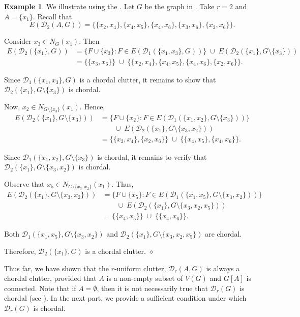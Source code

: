 \documentclass[12pt,reqno]{amsart}
\theoremstyle{definition}
\newtheorem{example}[proposition]{Example}
\def\D{\mathcal{D}}
\begin{document}
\medskip
\begin{example}
We illustrate  using the . Let $G$ be the graph in . Take $r=2$ and $A=\{x_1\}$. Recall that
\[
E(\D_2(A,G))
=
\{\{x_2,x_4\},\{x_4,x_5\},\{x_4,x_6\},\{x_3,x_6\},\{x_2,x_6\}\}.
\]

Consider $x_3 \in N_G(x_1)$. Then
\begin{align*}
E(\D_2(\{x_1\},G))
&=
\{F \cup \{x_3\} : F \in E(\D_1(\{x_1,x_3\},G))\}
\;\cup\;
E(\D_2(\{x_1\},G\setminus\{x_3\})) \\
&=
\{\{x_3,x_6\}\}
\;\cup\;
\{\{x_2,x_4\},\{x_4,x_5\},\{x_4,x_6\},\{x_2,x_6\}\}.
\end{align*}

\noindent
Since $\D_1(\{x_1,x_3\},G)$ is a chordal clutter, it remains to show that
$\D_2(\{x_1\},G\setminus\{x_3\})$ is chordal.

Now, $x_2 \in N_{G\setminus\{x_3\}}(x_1)$. Hence,
\begin{align*}
E(\D_2(\{x_1\},G\setminus\{x_3\}))
&=
\{F \cup \{x_2\} : F \in E(\D_1(\{x_1,x_2\},G\setminus\{x_3\}))\} \\
&\qquad \cup\;
E(\D_2(\{x_1\},G\setminus\{x_3,x_2\})) \\
&=
\{\{x_2,x_4\},\{x_2,x_6\}\}
\;\cup\;
\{\{x_4,x_5\},\{x_4,x_6\}\}.
\end{align*}

\noindent
Since $\D_1(\{x_1,x_2\},G\setminus\{x_3\})$ is chordal, it remains to verify that
$\D_2(\{x_1\},G\setminus\{x_3,x_2\})$ is chordal.

Observe that $x_5 \in N_{G\setminus\{x_3,x_2\}}(x_1)$. Thus,
\begin{align*}
E(\D_2(\{x_1\},G\setminus\{x_3,x_2\}))
&=
\{F \cup \{x_5\} : F \in E(\D_1(\{x_1,x_5\},G\setminus\{x_3,x_2\}))\} \\
&\qquad \cup\;
E(\D_2(\{x_1\},G\setminus\{x_3,x_2,x_5\})) \\
&=
\{\{x_4,x_5\}\}
\;\cup\;
\{\{x_4,x_6\}\}.
\end{align*}

\noindent
Both $\D_1(\{x_1,x_5\},G\setminus\{x_3,x_2\})$ and
$\D_2(\{x_1\},G\setminus\{x_3,x_2,x_5\})$ are chordal.

Therefore, $\D_2(\{x_1\},G)$ is a chordal clutter.
\hfill$\diamond$
\end{example}

\medskip
Thus far, we have shown that the $ r$-uniform clutter, $\D_r(A,G)$ is always a chordal clutter, provided that $A$ is a non-empty subset of $V(G)$ and $G[A]$ is connected. Note that if $A = \emptyset$, then it is not necessarily true that $\D_r(G)$ is chordal (see ). In the next part, we provide a sufficient condition under which $\D_r(G)$ is chordal.
\end{document}
